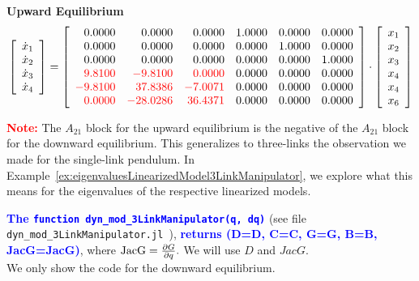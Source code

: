     \bigskip
\Ans \quad \textbf{Upward Equilibrium}
 $$\left[ \begin{array}{c} \dot{x}_1\\ \dot{x}_2 \\ \dot{x}_3 \\ \dot{x}_4 \end{array} \right]
 = \left[
\begin{array}{rrrrrr}
0.0000 & 0.0000 & 0.0000 & 1.0000 & 0.0000 & 0.0000 \\
0.0000 & 0.0000 & 0.0000 & 0.0000 & 1.0000 & 0.0000 \\
0.0000 & 0.0000 & 0.0000 & 0.0000 & 0.0000 & 1.0000 \\
\color{red} 9.8100 & \color{red} -9.8100 & \color{red} 0.0000 & 0.0000 & 0.0000 & 0.0000 \\
\color{red} -9.8100 & \color{red} 37.8386 & \color{red} -7.0071 & 0.0000 & 0.0000 & 0.0000 \\
\color{red} 0.0000 & \color{red} -28.0286 & \color{red} 36.4371 & 0.0000 & 0.0000 & 0.0000 \\
\end{array}
\right] \cdot \left[ \begin{array}{c} x_1\\ x_2 \\ x_3 \\x_4 \\ x_4 \\ x_6\end{array} \right]
$$

\textcolor{red}{\bf Note:} The $A_{21}$ block for the upward equilibrium is the negative of the $A_{21}$ block for the downward equilibrium. This generalizes to three-links the observation we made for the single-link pendulum. In Example~\ref{ex:eigenvaluesLinearizedModel3LinkManipulator}, we explore what this means for the eigenvalues of the respective linearized models. 


  \vspace*{.4cm}  
  \textcolor{blue}{\bf The \texttt{function dyn\_mod\_3LinkManipulator(q, dq)}} (see file \texttt{dyn\_mod\_3LinkManipulator.jl
}),  \textcolor{blue}{\bf returns (D=D, C=C, G=G, B=B, JacG=JacG)}, where ${\rm JacG } = \frac{\partial G}{\partial q}.$ We will use $D$ and $JacG$.\\

 We only show the code for the downward equilibrium.   

